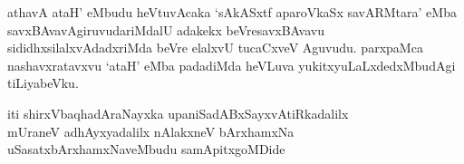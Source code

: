 \vskip 5pt
\begin{artha}
athavA ataH' eMbudu heVtuvAcaka `sAkASxtf aparoVkaSx savARMtara' eMba savxBAvavAgiruvudariMdalU adakekx beVre\break savxBAvavu sididhxsilalxvAdadxriMda beVre elalxvU tucaCxveV Aguvudu. parxpaMca nashavxratavxvu `ataH' eMba padadiMda heVLuva yukitx\-\break yuLaLxdedxMbudAgi tiLiyabeVku.
\end{artha}
\vskip 5pt
\begin{center}
iti shirxVbaqhadAraNayxka upaniSadABxSayxvAtiRkadalilx\\ mUraneV adhAyxyadalilx nAlakxneV bArxhamxNa\\ uSasatxbArxhamxNaveMbudu samApitxgoMDide 

\end{center}
